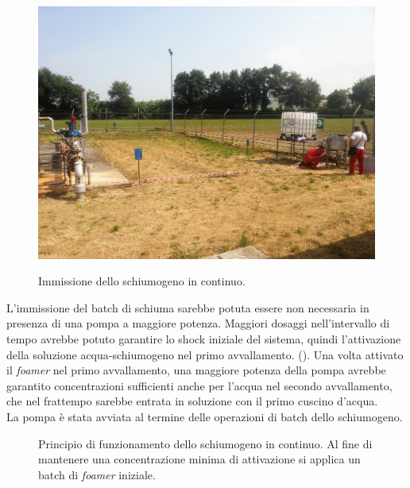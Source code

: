 \begin{figure}[htbp]
    {\includegraphics[height=.27\textheight]{fig/test/continuo-2} \label{fig:test-continuo-linea}}
\caption{Immissione dello schiumogeno in continuo.}
\label{fig:test-continuo}
\end{figure}

L'immissione del batch di schiuma sarebbe potuta essere non necessaria in presenza di una pompa a maggiore potenza. Maggiori dosaggi nell'intervallo di tempo avrebbe potuto garantire lo shock iniziale del sistema, quindi l'attivazione della soluzione acqua-schiumogeno nel primo avvallamento. (). Una volta attivato il \textit{foamer} nel primo avvallamento, una maggiore potenza della pompa avrebbe garantito concentrazioni sufficienti anche per l'acqua nel secondo avvallamento, che nel frattempo sarebbe entrata in soluzione con il primo cuscino d'acqua.\\
La pompa è stata avviata al termine delle operazioni di batch dello schiumogeno.

\begin{figure}[htbp]
    \centering
     \qquad
\caption{Principio di funzionamento dello schiumogeno in continuo. Al fine di mantenere una concentrazione minima di attivazione si applica un batch di \textit{foamer} iniziale.}
\label{fig:continuo-model}
\end{figure}

